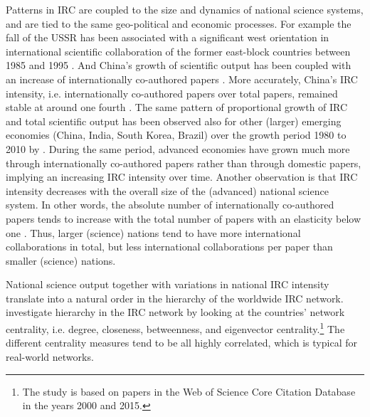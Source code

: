 Patterns in IRC are coupled to the size and dynamics of national science systems, and are tied to the same geo-political and economic processes. For example the fall of the USSR has been associated with a significant west orientation in international scientific collaboration of the former east-block countries between 1985 and 1995 \citep{braun1996international}. And China's growth of scientific output has been coupled with an increase of internationally co-authored papers \citep{niu2014network}. More accurately, China's IRC intensity, i.e. internationally co-authored papers over total papers, remained stable at around one fourth \citep{niu2014network}. The same pattern of proportional growth of IRC and total scientific output has been observed also for other (larger) emerging economies (China, India, South Korea, Brazil) over the growth period 1980 to 2010 by \cite{adams2013fourth}. During the same period, advanced economies have grown much more through internationally co-authored papers rather than through domestic papers, implying an increasing IRC intensity over time. Another observation is that IRC intensity decreases with the overall size of the (advanced) national science system. In other words, the absolute number of internationally co-authored papers tends to increase with the total number of papers with an elasticity below one \citep{davidson1979international,luukkonen1992understanding,pan2012world}. Thus, larger (science) nations tend to have more international collaborations in total, but less international collaborations per paper than smaller (science) nations.

National science output together with variations in national IRC intensity translate into a natural order in the hierarchy of the worldwide IRC network. \cite{gui2018international} investigate hierarchy in the IRC network by looking at the countries' network centrality, i.e. degree, closeness, betweenness, and eigenvector centrality.\footnote{The study is based on papers in the Web of Science Core Citation Database in the years 2000 and 2015.} The different centrality measures tend to be all highly correlated, which is typical for real-world networks. 

